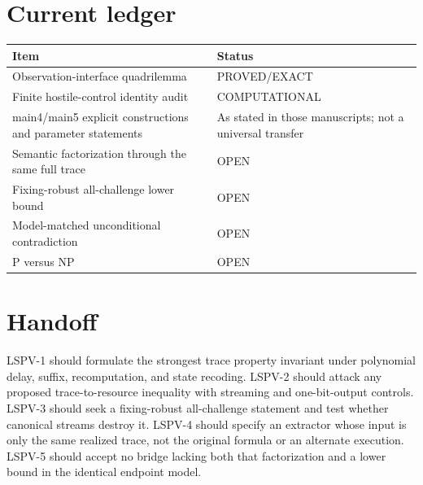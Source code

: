 \documentclass[11pt]{article}
\newcommand{\OPEN}{\textsf{OPEN}}
\newcommand{\EXACT}{\textsf{PROVED/EXACT}}
\newcommand{\COMP}{\textsf{COMPUTATIONAL}}
\begin{document}
\section*{Current ledger}
\begin{center}
\begin{tabular}{p{}p{}}
\toprule
Item & Status\\
\midrule
Observation-interface quadrilemma & \EXACT{}\\
Finite hostile-control identity audit & \COMP{}\\
main4/main5 explicit constructions and parameter statements & As stated in those manuscripts; not a universal transfer\\
Semantic factorization through the same full trace & \OPEN{}\\
Fixing-robust all-challenge lower bound & \OPEN{}\\
Model-matched unconditional contradiction & \OPEN{}\\
P versus NP & \OPEN{}\\
\bottomrule
\end{tabular}
\end{center}

\section*{Handoff}
LSPV-1 should formulate the strongest trace property invariant under polynomial
delay, suffix, recomputation, and state recoding.  LSPV-2 should attack any
proposed trace-to-resource inequality with streaming and one-bit-output
controls.  LSPV-3 should seek a fixing-robust all-challenge statement and test
whether canonical streams destroy it.  LSPV-4 should specify an extractor whose
input is only the same realized trace, not the original formula or an alternate
execution.  LSPV-5 should accept no bridge lacking both that factorization and
a lower bound in the identical endpoint model.
\end{document}
